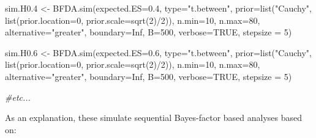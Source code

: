\documentclass[
]{book}
\newenvironment{Shaded}{\begin{snugshade}}{\end{snugshade}}
\newcommand{\AttributeTok}[1]{\textcolor[rgb]{0.77,0.63,0.00}{#1}}
\newcommand{\CommentTok}[1]{\textcolor[rgb]{0.56,0.35,0.01}{\textit{#1}}}
\newcommand{\ConstantTok}[1]{\textcolor[rgb]{0.00,0.00,0.00}{#1}}
\newcommand{\DecValTok}[1]{\textcolor[rgb]{0.00,0.00,0.81}{#1}}
\newcommand{\FloatTok}[1]{\textcolor[rgb]{0.00,0.00,0.81}{#1}}
\newcommand{\FunctionTok}[1]{\textcolor[rgb]{0.00,0.00,0.00}{#1}}
\newcommand{\NormalTok}[1]{#1}
\newcommand{\OtherTok}[1]{\textcolor[rgb]{0.56,0.35,0.01}{#1}}
\newcommand{\SpecialCharTok}[1]{\textcolor[rgb]{0.00,0.00,0.00}{#1}}
\newcommand{\StringTok}[1]{\textcolor[rgb]{0.31,0.60,0.02}{#1}}
\begin{document}
\begin{Shaded}
\begin{Highlighting}[]
\NormalTok{sim.H0}\FloatTok{.4} \OtherTok{\textless{}{-}} \FunctionTok{BFDA.sim}\NormalTok{(}\AttributeTok{expected.ES=}\FloatTok{0.4}\NormalTok{, }\AttributeTok{type=}\StringTok{"t.between"}\NormalTok{, }\AttributeTok{prior=}\FunctionTok{list}\NormalTok{(}\StringTok{"Cauchy"}\NormalTok{, }\FunctionTok{list}\NormalTok{(}\AttributeTok{prior.location=}\DecValTok{0}\NormalTok{, }\AttributeTok{prior.scale=}\FunctionTok{sqrt}\NormalTok{(}\DecValTok{2}\NormalTok{)}\SpecialCharTok{/}\DecValTok{2}\NormalTok{)), }\AttributeTok{n.min=}\DecValTok{10}\NormalTok{, }\AttributeTok{n.max=}\DecValTok{80}\NormalTok{, }\AttributeTok{alternative=}\StringTok{"greater"}\NormalTok{, }\AttributeTok{boundary=}\ConstantTok{Inf}\NormalTok{, }\AttributeTok{B=}\DecValTok{500}\NormalTok{, }\AttributeTok{verbose=}\ConstantTok{TRUE}\NormalTok{, }\AttributeTok{stepsize =} \DecValTok{5}\NormalTok{)}

\NormalTok{sim.H0}\FloatTok{.6} \OtherTok{\textless{}{-}} \FunctionTok{BFDA.sim}\NormalTok{(}\AttributeTok{expected.ES=}\FloatTok{0.6}\NormalTok{, }\AttributeTok{type=}\StringTok{"t.between"}\NormalTok{, }\AttributeTok{prior=}\FunctionTok{list}\NormalTok{(}\StringTok{"Cauchy"}\NormalTok{, }\FunctionTok{list}\NormalTok{(}\AttributeTok{prior.location=}\DecValTok{0}\NormalTok{, }\AttributeTok{prior.scale=}\FunctionTok{sqrt}\NormalTok{(}\DecValTok{2}\NormalTok{)}\SpecialCharTok{/}\DecValTok{2}\NormalTok{)), }\AttributeTok{n.min=}\DecValTok{10}\NormalTok{, }\AttributeTok{n.max=}\DecValTok{80}\NormalTok{, }\AttributeTok{alternative=}\StringTok{"greater"}\NormalTok{, }\AttributeTok{boundary=}\ConstantTok{Inf}\NormalTok{, }\AttributeTok{B=}\DecValTok{500}\NormalTok{, }\AttributeTok{verbose=}\ConstantTok{TRUE}\NormalTok{, }\AttributeTok{stepsize =} \DecValTok{5}\NormalTok{)}

\CommentTok{\#etc...}
\end{Highlighting}
\end{Shaded}

As an explanation, these simulate sequential Bayes-factor based analyses based on:
\end{document}
